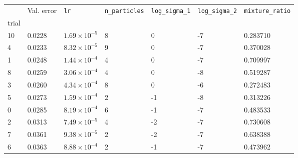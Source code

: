 \begin{tabular}{lp{2.3cm}p{2.3cm}p{2.3cm}p{2.3cm}p{2.3cm}p{2.3cm}}
\toprule
{} &  Val. error &         \texttt{lr} &  \texttt{n\_particles} &  \texttt{log\_sigma\_1} &  \texttt{log\_sigma\_2} &  \texttt{mixture\_ratio} \\
trial &             &                     &                        &                         &                         &                          \\
\midrule
10    &      0.0228 & $1.69\times10^{-5}$ &                      8 &                       0 &                      -7 &                 0.283710 \\
4     &      0.0233 & $8.32\times10^{-5}$ &                      9 &                       0 &                      -7 &                 0.370028 \\
1     &      0.0248 & $1.44\times10^{-4}$ &                      4 &                       0 &                      -7 &                 0.709997 \\
8     &      0.0259 & $3.06\times10^{-4}$ &                      4 &                       0 &                      -8 &                 0.519287 \\
3     &      0.0260 & $4.34\times10^{-4}$ &                      8 &                       0 &                      -6 &                 0.272483 \\
5     &      0.0273 & $1.59\times10^{-4}$ &                      2 &                      -1 &                      -8 &                 0.313226 \\
0     &      0.0285 & $8.19\times10^{-4}$ &                      6 &                      -1 &                      -7 &                 0.483533 \\
2     &      0.0313 & $7.49\times10^{-5}$ &                      4 &                      -2 &                      -7 &                 0.730608 \\
7     &      0.0361 & $9.38\times10^{-5}$ &                      2 &                      -2 &                      -7 &                 0.638388 \\
6     &      0.0363 & $8.88\times10^{-4}$ &                      2 &                      -1 &                      -7 &                 0.473962 \\
\bottomrule
\end{tabular}
